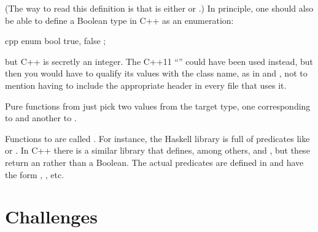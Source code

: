 (The way to read this definition is that  is either
 or .) In principle, one should also be able
to define a Boolean type in C++ as an enumeration:

\begin{snip}{cpp}
enum bool { 
    true,
    false
};
\end{snip}
but C++  is secretly an integer. The C++11
``'' could have been used instead, but then you
would have to qualify its values with the class name, as in
 and , not to mention having to
include the appropriate header in every file that uses it.

Pure functions from  just pick two values from the target
type, one corresponding to  and another to .

Functions to  are called . For instance,
the Haskell library  is full of predicates like
 or . In C++ there is a similar library
\code{} that defines, among others,  and
, but these return an  rather than a
Boolean. The actual predicates are defined in  and
have the form , , etc.

\section{Challenges}


